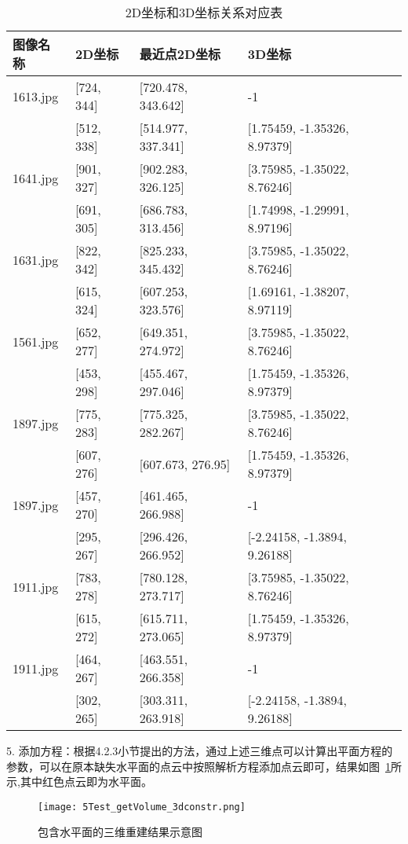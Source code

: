 \begin{table}[h]
  \centering
  \caption{2D坐标和3D坐标关系对应表}
  \label{tab:chap1:2D_3D}
  \begin{tabular}{C{1.6cm}L{2.4cm}L{4.4cm}L{4.4cm}}
  \toprule
  \textbf{图像名称} & \textbf{2D坐标} &\textbf{最近点2D坐标} &  \textbf{3D坐标}  \\
  \midrule
  1613.jpg  &[724, 344]   &[720.478,  343.642]  & -1\\
            &[512, 338]   &[514.977,  337.341]  & [1.75459, -1.35326, 8.97379]\\
  1641.jpg  &[901, 327]   &[902.283,  326.125]  & [3.75985, -1.35022, 8.76246]\\
            &[691, 305]   &[686.783,  313.456]  & [1.74998, -1.29991, 8.97196]\\
  1631.jpg  &[822, 342]   &[825.233,  345.432]  &[3.75985, -1.35022, 8.76246]\\
            &[615, 324]   &[607.253,  323.576]  &[1.69161, -1.38207, 8.97119]\\
  1561.jpg  &[652, 277]   &[649.351,  274.972]  &[3.75985, -1.35022, 8.76246]\\
            &[453, 298]   &[455.467,  297.046]  &[1.75459, -1.35326, 8.97379]\\
  1897.jpg  &[775, 283]   &[775.325,  282.267]  &[3.75985, -1.35022, 8.76246]\\
            &[607, 276]   &[607.673,  276.95]   &[1.75459, -1.35326, 8.97379]\\
  1897.jpg  &[457, 270]   &[461.465,  266.988]  & -1\\
            &[295, 267]   &[296.426,  266.952]  &[-2.24158, -1.3894, 9.26188]\\
  1911.jpg  &[783, 278]   &[780.128,  273.717]  &[3.75985, -1.35022, 8.76246]\\
            &[615, 272]   &[615.711,  273.065]  &[1.75459, -1.35326, 8.97379]\\
  1911.jpg  &[464, 267]   &[463.551,  266.358]  &-1\\
            &[302, 265]   &[303.311,  263.918]  &[-2.24158, -1.3894, 9.26188]\\
  \bottomrule
  \end{tabular}
\end{table}

5. 添加方程：根据4.2.3小节提出的方法，通过上述三维点可以计算出平面方程的参数，可以在原本缺失水平面的点云中按照解析方程添加点云即可，结果如图~\ref{fig:5Test_getVolume_3dconstr}所示,其中红色点云即为水平面。
\begin{figure}[H] %
  \centering
  \texttt{[image: 5Test\_getVolume\_3dconstr.png]}
  \caption{包含水平面的三维重建结果示意图}
  \label{fig:5Test_getVolume_3dconstr}
  \end{figure}
